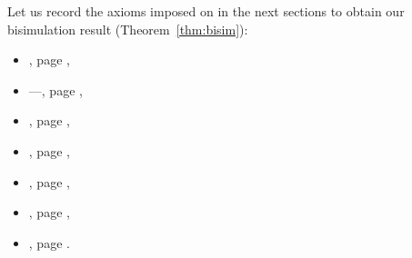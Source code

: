 \documentclass{LMCS}
\theoremstyle{plain}\newtheorem{satz}[thm]{Satz}
\begin{document}
Let us record the axioms imposed on  in the next sections to
obtain our bisimulation result (Theorem~\ref{thm:bisim}):
\begin{center}
  \begin{minipage}[t]{0.48\linewidth}
    \begin{itemize}
    \item {}, page \pageref{fibration},
    \item {}---, page
      \pageref{discreteness},
    \item {}, page \pageref{ax:views},
    \item {}, page \pageref{leftdecomposition},
    \end{itemize}
  \end{minipage}
  \hfil
  \begin{minipage}[t]{0.48\linewidth}
    \begin{itemize}
    \item {}, page \pageref{views:decomp},
    \item {}, page \pageref{finiteness},
    \item {}, page \pageref{basic:full}.
    \end{itemize}
  \end{minipage}
\end{center}
\end{document}
